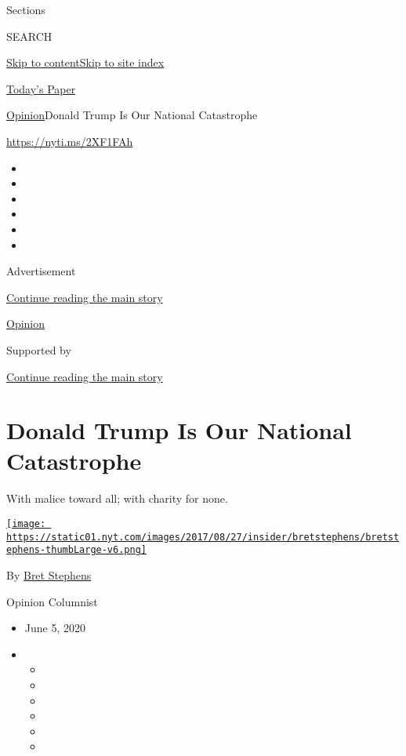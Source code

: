 Sections

SEARCH

\protect\hyperlink{site-content}{Skip to
content}\protect\hyperlink{site-index}{Skip to site index}

\href{https://myaccount.nytimes.com/auth/login?response_type=cookie\&client_id=vi}{}

\href{https://www.nytimes.com/section/todayspaper}{Today's Paper}

\href{/section/opinion}{Opinion}\textbar{}Donald Trump Is Our National
Catastrophe

\href{https://nyti.ms/2XF1FAh}{https://nyti.ms/2XF1FAh}

\begin{itemize}
\item
\item
\item
\item
\item
\item
\end{itemize}

Advertisement

\protect\hyperlink{after-top}{Continue reading the main story}

\href{/section/opinion}{Opinion}

Supported by

\protect\hyperlink{after-sponsor}{Continue reading the main story}

\hypertarget{donald-trump-is-our-national-catastrophe}{%
\section{Donald Trump Is Our National
Catastrophe}\label{donald-trump-is-our-national-catastrophe}}

With malice toward all; with charity for none.

\href{https://www.nytimes.com/by/bret-stephens}{\texttt{[image: https://static01.nyt.com/images/2017/08/27/insider/bretstephens/bretstephens-thumbLarge-v6.png]}}

By \href{https://www.nytimes.com/by/bret-stephens}{Bret Stephens}

Opinion Columnist

\begin{itemize}
\item
  June 5, 2020
\item
  \begin{itemize}
  \item
  \item
  \item
  \item
  \item
  \item
  \end{itemize}
\end{itemize}

